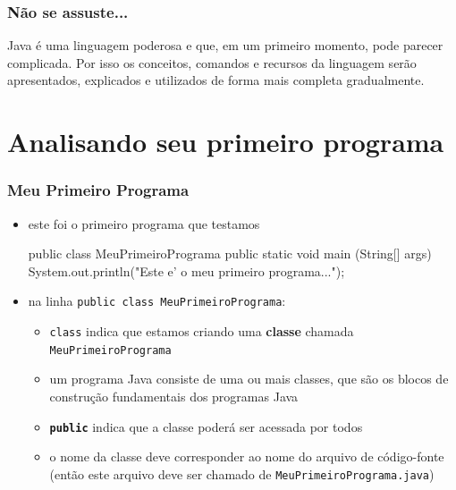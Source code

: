 \documentclass[aspectratio=169]{beamer}
\begin{document}
\begin{frame}\frametitle{Não se assuste...}
Java é uma linguagem poderosa e que, em um primeiro momento, pode parecer complicada.
Por isso os conceitos, comandos e recursos da linguagem serão apresentados, explicados e utilizados de forma mais completa gradualmente.
\end{frame}

\section{Analisando seu primeiro programa}

\begin{frame}[fragile]\frametitle{Meu Primeiro Programa}
\begin{itemize}
	\item este foi o primeiro programa que testamos
\begin{javacode}
public class MeuPrimeiroPrograma {
  public static void main (String[] args) {
    System.out.println("Este e' o meu primeiro programa...");
  }
}
\end{javacode}
	\item na linha \texttt{public class MeuPrimeiroPrograma}:
	\begin{itemize}
		\item \texttt{class} indica que estamos criando uma \textbf{classe} chamada \texttt{MeuPrimeiroPrograma}
		\item um programa Java consiste de uma ou mais classes, que são os blocos de construção fundamentais dos programas Java
		\item \texttt{\textbf{public}} indica que a classe poderá ser acessada por todos
		\item o nome da classe deve corresponder ao nome do arquivo de código-fonte (então este arquivo deve ser chamado de \texttt{MeuPrimeiroPrograma.java})
	\end{itemize}
\end{itemize}
\end{frame}
\end{document}
